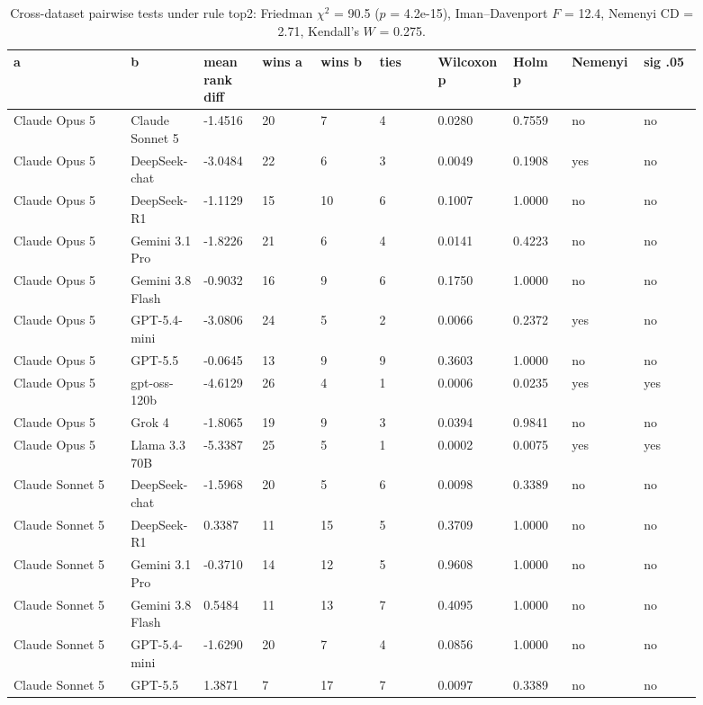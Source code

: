 \begin{landscape}
\tiny
\setlength{\tabcolsep}{3pt}
\begin{longtable}{p{0.162\linewidth}p{0.081\linewidth}p{0.081\linewidth}p{0.081\linewidth}p{0.081\linewidth}p{0.081\linewidth}p{0.081\linewidth}p{0.081\linewidth}p{0.081\linewidth}p{0.081\linewidth}}
\caption{Cross-dataset pairwise tests under rule top2: Friedman $\chi^2$ = 90.5 ($p$ = 4.2e-15), Iman--Davenport $F$ = 12.4, Nemenyi CD = 2.71, Kendall's $W$ = 0.275.}\label{tab:pairwise_top2}\\
\toprule
a & b & mean rank diff & wins a & wins b & ties & Wilcoxon p & Holm p & Nemenyi & sig .05 \\
\midrule
Claude Opus 5 & Claude Sonnet 5 & -1.4516 & 20 & 7 & 4 & 0.0280 & 0.7559 & no & no \\
Claude Opus 5 & DeepSeek-chat & -3.0484 & 22 & 6 & 3 & 0.0049 & 0.1908 & yes & no \\
Claude Opus 5 & DeepSeek-R1 & -1.1129 & 15 & 10 & 6 & 0.1007 & 1.0000 & no & no \\
Claude Opus 5 & Gemini 3.1 Pro & -1.8226 & 21 & 6 & 4 & 0.0141 & 0.4223 & no & no \\
Claude Opus 5 & Gemini 3.8 Flash & -0.9032 & 16 & 9 & 6 & 0.1750 & 1.0000 & no & no \\
Claude Opus 5 & GPT-5.4-mini & -3.0806 & 24 & 5 & 2 & 0.0066 & 0.2372 & yes & no \\
Claude Opus 5 & GPT-5.5 & -0.0645 & 13 & 9 & 9 & 0.3603 & 1.0000 & no & no \\
Claude Opus 5 & gpt-oss-120b & -4.6129 & 26 & 4 & 1 & 0.0006 & 0.0235 & yes & yes \\
Claude Opus 5 & Grok 4 & -1.8065 & 19 & 9 & 3 & 0.0394 & 0.9841 & no & no \\
Claude Opus 5 & Llama 3.3 70B & -5.3387 & 25 & 5 & 1 & 0.0002 & 0.0075 & yes & yes \\
Claude Sonnet 5 & DeepSeek-chat & -1.5968 & 20 & 5 & 6 & 0.0098 & 0.3389 & no & no \\
Claude Sonnet 5 & DeepSeek-R1 & 0.3387 & 11 & 15 & 5 & 0.3709 & 1.0000 & no & no \\
Claude Sonnet 5 & Gemini 3.1 Pro & -0.3710 & 14 & 12 & 5 & 0.9608 & 1.0000 & no & no \\
Claude Sonnet 5 & Gemini 3.8 Flash & 0.5484 & 11 & 13 & 7 & 0.4095 & 1.0000 & no & no \\
Claude Sonnet 5 & GPT-5.4-mini & -1.6290 & 20 & 7 & 4 & 0.0856 & 1.0000 & no & no \\
Claude Sonnet 5 & GPT-5.5 & 1.3871 & 7 & 17 & 7 & 0.0097 & 0.3389 & no & no \\

\end{longtable}
\end{landscape}
